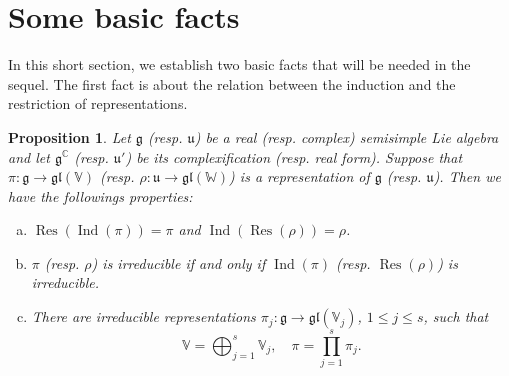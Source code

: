 \documentclass[11pt,reqno]{amsart}
\DeclareMathOperator{\Ind}{Ind}
\DeclareMathOperator{\Res}{Res}
\newtheorem{proposition}[theorem]{Proposition}
\begin{document}
\section{Some basic facts}
In this short section,  we establish two basic facts that will be needed in the sequel.  The first fact is about the relation between the induction and the restriction of representations.  
\begin{proposition}\label{prop: irr R,C rep}
Let $\mathfrak{g}$ (resp.  $\mathfrak{u}$) be a real (resp.  complex) semisimple Lie algebra and let $\mathfrak{g}^{\mathbb{C}}$ (resp.  $\mathfrak{u}'$) be its complexification (resp.  real form).  Suppose that $\pi: \mathfrak{g} \to \mathfrak{gl}(\mathbb{V})$ (resp.  $\rho: \mathfrak{u} \to \mathfrak{gl}(\mathbb{W})$) is a representation of $\mathfrak{g}$ (resp.  $\mathfrak{u}$).  Then we have the followings properties:
\begin{enumerate}[(a)]
\item $\Res ( \Ind(\pi) ) = \pi$ and $\Ind (\Res (\rho)) = \rho$. \label{prop: irr R,C rep:item1}
\item $\pi$ (resp.  $\rho$) is irreducible if and only if $ \Ind(\pi)$ (resp.  $\Res(\rho)$) is irreducible.\label{prop: irr R,C rep:item2}
\item There are irreducible representations $\pi_j: \mathfrak{g} \to \mathfrak{gl}(\mathbb{V}_j)$,  $1 \le j \le s$,   such that 
\[
\mathbb{V} = \bigoplus_{j=1}^s \mathbb{V}_j,\quad \pi = \prod_{j=1}^s \pi_j.
\]\label{prop: irr R,C rep:item3}
\end{enumerate}
\end{proposition}
\end{document}
